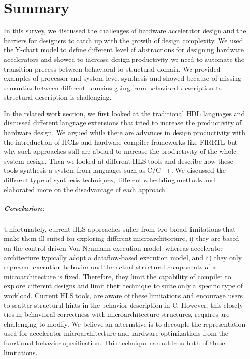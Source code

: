 
\chapter{Summary}

In this survey, we discussed the challenges of hardware accelerator design and the barriers for designers to catch up with the growth of design complexity.
We used the Y-chart model to define different level of abstractions for designing hardware accelerators and showed to increase design productivity we need to automate the transition process between behavioral to structural domain.
We provided examples of processor and system-level synthesis and showed because of missing semantics between different domains going from behavioral description to structural description is challenging.

In the related work section, we first looked at the traditional HDL languages and discussed different language extensions that tried to increase the productivity of hardware design.
We argued while there are advances in design productivity with the introduction of HCLs and hardware compiler frameworks like FIRRTL but why such approaches still are aboard to increase the productivity of the whole system design.
Then we looked at different HLS tools and describe how these tools synthesis a system from languages such as C/C++.
We discussed the different type of synthesis techniques, different scheduling methods and elaborated more on the disadvantage of each approach.

\paragraph{Conclusion:}
Unfortunately, current HLS approaches suffer from two broad limitations that make them ill suited for exploring different microarchitecture,
i) they are based on the control-driven Von-Neumann execution  model,  whereas  accelerator  architecture typically adopt a dataflow-based execution model,
and ii) they only represent execution behavior and the actual structural components of a microarchitecture is fixed.
Therefore, they limit the capability of compiler to explore different designs and limit their technique to suite only a specific type of workload.
Current HLS tools, are aware of these limitations and encourage users to scatter structural hints in the behavior description in C. However, this closely ties in behavioral correctness with microarchitecture structures, requires are challenging to modify.
We believe an alternative is to decouple the representation used for accelerator microarchitecture and hardware optimizations from the functional behavior specification. This technique can address both of these limitations.